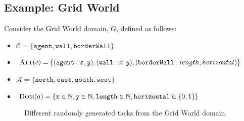 \documentclass[11pt]{article}
\begin{document}
\subsection{Example: Grid World}

 Consider the Grid World domain, $G$, defined as follows:
\begin{itemize}
\item $\mathcal{C} = \{\texttt{agent}, \texttt{wall}, \texttt{borderWall}\}$
\item $\textsc{Att}(c) = \{(\texttt{agent} : x, y), (\texttt{wall} : x, y), (\texttt{borderWall} : length, horizontal)\}$
\item $\mathcal{A} = \{\texttt{north}, \texttt{east}, \texttt{south}, \texttt{west}\}$
\item $\textsc{Dom}(a) = \{\texttt{x} \in \mathbb{N}, \texttt{y} \in \mathbb{N},  \texttt{length} \in \mathbb{N}, \texttt{horizontal} \in \{0,1\}\}$
\end{itemize}

\begin{figure}
\centering
{}\hspace{10mm}
  \caption{Different randomly generated tasks from the Grid World domain.}
  \label{fig:grid_examples}
\end{figure}
\end{document}
